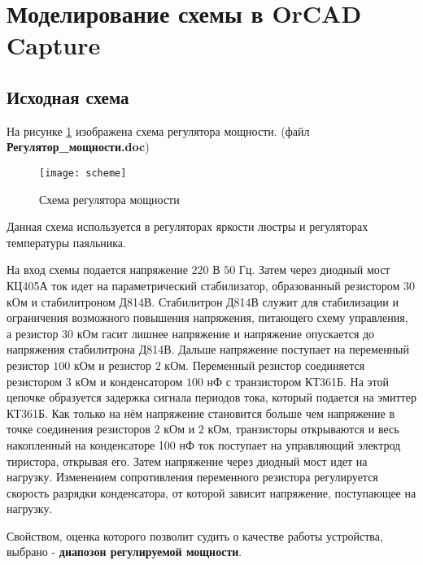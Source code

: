 





\tableofcontents
\newpage

\section{Моделирование схемы в OrCAD Capture}

\subsection{Исходная схема}

На рисунке \ref{pic:scheme} изображена схема регулятора мощности. (файл \textbf{Регулятор\_мощности.doc})

\begin{figure}[H]
\begin{center}
	\texttt{[image: scheme]}
	\caption{Схема регулятора мощности}
	\label{pic:scheme}
\end{center}
\end{figure}

Данная схема используется в регуляторах яркости люстры и регуляторах температуры паяльника.

На вход схемы подается напряжение $220$ В $50$ Гц. Затем через диодный мост КЦ405А ток идет на параметрический стабилизатор, образованный резистором $30$ кОм и стабилитроном Д814В. Стабилитрон Д814В служит для стабилизации и ограничения возможного повышения напряжения, питающего схему управления, а резистор $30$ кОм гасит лишнее напряжение и напряжение опускается до напряжения стабилитрона Д814В. Дальше напряжение поступает на переменный резистор $100$ кОм и резистор $2$ кОм. Переменный резистор соединяется резистором $3$ кОм и конденсатором $100$ нФ с транзистором КТ361Б. На этой цепочке образуется задержка сигнала периодов тока, который подается на эмиттер КТ361Б. Как только на нём напряжение становится больше чем напряжение в точке соединения резисторов $2$ кОм и $2$ кОм, транзисторы открываются и весь накопленный на конденсаторе 100 нФ ток поступает на управляющий электрод тиристора, открывая его. Затем напряжение через диодный мост идет на нагрузку. Изменением сопротивления переменного резистора регулируется скорость разрядки конденсатора, от которой зависит напряжение, поступающее на нагрузку.

Свойством, оценка которого позволит судить о качестве работы устройства, выбрано - \textbf{диапозон регулируемой мощности}.

